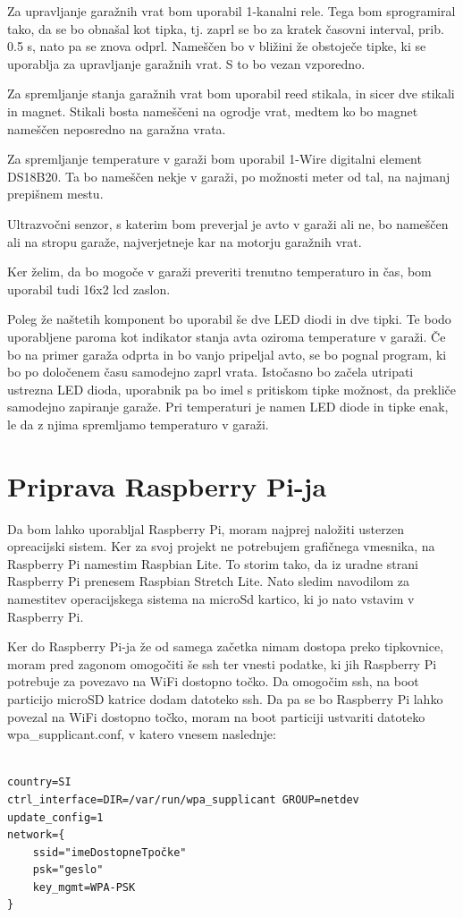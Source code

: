 \documentclass[11pt]{article}
\begin{document}
  Za upravljanje garažnih vrat bom uporabil 1-kanalni rele. Tega bom sprogramiral tako, da se bo obnašal kot tipka, tj. zaprl se bo za kratek časovni interval, prib. 0.5 s, nato pa se znova odprl. Nameščen bo v bližini že obstoječe tipke, ki se uporablja za upravljanje garažnih vrat. S to bo vezan vzporedno.

  Za spremljanje stanja garažnih vrat bom uporabil reed stikala, in sicer dve stikali in magnet. Stikali bosta nameščeni na ogrodje vrat, medtem ko bo magnet nameščen neposredno na garažna vrata.

  Za spremljanje temperature v garaži bom uporabil 1-Wire digitalni element DS18B20. Ta bo nameščen nekje v garaži, po možnosti meter od tal, na najmanj prepišnem mestu.

  Ultrazvočni senzor, s katerim bom preverjal je avto v garaži ali ne, bo nameščen ali na stropu garaže, najverjetneje kar na motorju garažnih vrat.

  Ker želim, da bo mogoče v garaži preveriti trenutno temperaturo in čas, bom uporabil tudi 16x2 \gls{lcd} zaslon.

  Poleg že naštetih komponent bo uporabil še dve LED diodi in dve tipki. Te bodo uporabljene paroma kot indikator stanja avta oziroma temperature v garaži. Če bo na primer garaža odprta in bo vanjo pripeljal avto, se bo pognal program, ki bo po določenem času samodejno zaprl vrata. Istočasno bo začela utripati ustrezna LED dioda, uporabnik pa bo imel s pritiskom tipke možnost, da prekliče samodejno zapiranje garaže. Pri temperaturi je namen LED diode in tipke enak, le da z njima spremljamo temperaturo v garaži.
\section{Priprava Raspberry Pi-ja}
 Da bom lahko uporabljal Raspberry Pi, moram najprej naložiti usterzen opreacijski sistem. Ker za svoj projekt ne potrebujem grafičnega vmesnika, na Raspberry Pi namestim Raspbian Lite. To storim tako, da iz uradne strani Raspberry Pi \cite{RPi_raspbian} prenesem Raspbian Stretch Lite. Nato sledim navodilom za namestitev \cite{RPi_install} operacijskega sistema na microSd kartico, ki jo nato vstavim v Raspberry Pi.

Ker do Raspberry Pi-ja že od samega začetka nimam dostopa preko tipkovnice, moram pred zagonom omogočiti še \gls{ssh} ter vnesti podatke, ki jih Raspberry Pi potrebuje za povezavo na WiFi dostopno točko. Da omogočim \gls{ssh}, na boot particijo microSD katrice dodam datoteko ssh. Da pa se bo Raspberry Pi lahko povezal na WiFi dostopno točko, moram na boot particiji ustvariti datoteko wpa\_supplicant.conf, v katero vnesem naslednje:
\newpage
\begin{verbatim}

country=SI
ctrl_interface=DIR=/var/run/wpa_supplicant GROUP=netdev
update_config=1
network={
	ssid="imeDostopneTpočke"
	psk="geslo"
	key_mgmt=WPA-PSK
}
\end{verbatim}
\end{document}
